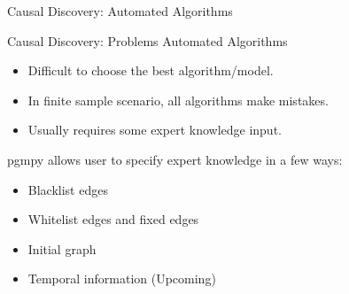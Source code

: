 \documentclass[aspectratio=169]{beamer}
\begin{document}
\begin{frame}[fragile]{Causal Discovery: Automated Algorithms}
\end{frame}

\begin{frame}{Causal Discovery: Problems Automated Algorithms}
	\begin{itemize}
		\item Difficult to choose the best algorithm/model.
		\item In finite sample scenario, all algorithms make mistakes.
		\item Usually requires some expert knowledge input.
	\end{itemize}

	\vspace{2em}

	pgmpy allows user to specify expert knowledge in a few ways:
	\begin{itemize}
		\item Blacklist edges
		\item Whitelist edges and fixed edges
		\item Initial graph
		\item Temporal information (Upcoming)
	\end{itemize}
	
\end{frame}
\end{document}
